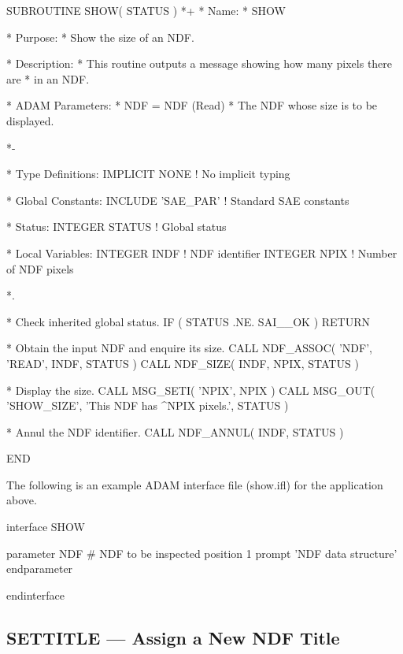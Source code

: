 \documentclass[twoside,11pt,nolof]{starlink}
\begin{document}
\small
\begin{terminalv}
      SUBROUTINE SHOW( STATUS )
*+
*  Name:
*     SHOW

*  Purpose:
*     Show the size of an NDF.

*  Description:
*     This routine outputs a message showing how many pixels there are
*     in an NDF.

*  ADAM Parameters:
*     NDF = NDF (Read)
*        The NDF whose size is to be displayed.

*-

*  Type Definitions:
      IMPLICIT NONE              ! No implicit typing

*  Global Constants:
      INCLUDE 'SAE_PAR'          ! Standard SAE constants

*  Status:
      INTEGER STATUS             ! Global status

*  Local Variables:
      INTEGER INDF               ! NDF identifier
      INTEGER NPIX               ! Number of NDF pixels

*.

*  Check inherited global status.
      IF ( STATUS .NE. SAI__OK ) RETURN

*  Obtain the input NDF and enquire its size.
      CALL NDF_ASSOC( 'NDF', 'READ', INDF, STATUS )
      CALL NDF_SIZE( INDF, NPIX, STATUS )

*  Display the size.
      CALL MSG_SETI( 'NPIX', NPIX )
      CALL MSG_OUT( 'SHOW_SIZE', 'This NDF has ^NPIX pixels.', STATUS )

*  Annul the NDF identifier.
      CALL NDF_ANNUL( INDF, STATUS )

      END
\end{terminalv}
\normalsize

The following is an example ADAM interface file (show.ifl) for the application
above.

\small
\begin{terminalv}
interface SHOW

   parameter NDF                 # NDF to be inspected
      position 1
      prompt   'NDF data structure'
   endparameter

endinterface
\end{terminalv}
\normalsize

\newpage
\subsection{\label{ss:titleexample}SETTITLE --- Assign a New NDF Title}
\end{document}
